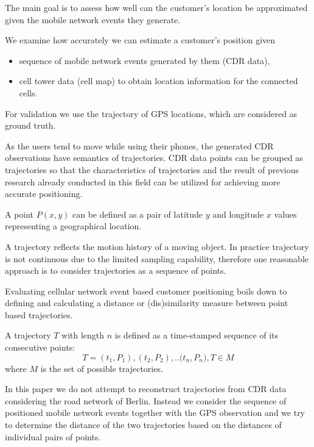 The main goal is to assess how well can the customer's location be approximated given the mobile network events they generate.

We examine how accurately we can estimate a customer's position given
\begin{itemize}
    \item sequence of mobile network events generated by them (CDR data),
    \item cell tower data (cell map) to obtain location information for the connected cells.
\end{itemize}

For validation we use the trajectory of GPS locations, which are considered as ground truth.

As the users tend to move while using their phones, the generated CDR observations have semantics of trajectories. CDR data points can be grouped as trajectories so that the characteristics of trajectories and the result of previous research already conducted in this field can be utilized for achieving more accurate positioning.

\begin{definition}
A point $P(x,y)$ can be defined as a pair of latitude $y$ and longitude $x$ values representing a geographical location.
\end{definition}

A trajectory reflects the motion history of a moving object. In practice trajectory is not continuous due to the limited sampling capability, therefore one reasonable approach is to consider trajectories as a sequence of points.

Evaluating cellular network event based customer positioning boils down to defining and calculating a distance or (dis)similarity measure between point based trajectories.

\begin{definition}
A trajectory $T$ with length $n$ is defined as a time-stamped sequence of its consecutive points: \[T={(t_{1},P_{1}), (t_{2},P_{2}), .. (t_{n},P_{n}}), T \in M\]
where $M$ is the set of possible trajectories.
\end{definition}

In this paper we do not attempt to reconstruct trajectories from CDR data considering the road network of Berlin. Instead we consider the sequence of positioned mobile network events together with the GPS observation and we try to determine the distance of the two trajectories based on the distances of individual pairs of points.

